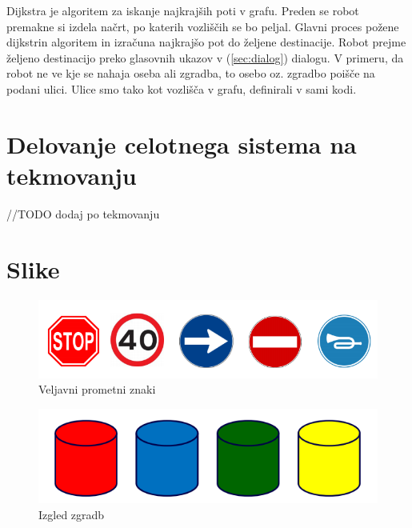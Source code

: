 \documentclass[a4paper,11pt]{article}
\begin{document}
Dijkstra je algoritem za iskanje najkrajših poti v grafu. Preden se robot premakne si izdela načrt, po katerih vozliščih se bo peljal. Glavni proces požene dijkstrin algoritem in izračuna najkrajšo pot do željene destinacije. Robot prejme željeno destinacijo preko glasovnih ukazov v (\ref{sec:dialog}{}) dialogu. V primeru, da robot ne ve kje se nahaja oseba ali zgradba, to osebo oz. zgradbo poišče na podani ulici. Ulice smo tako kot vozlišča v grafu, definirali v sami kodi.

\section{Delovanje celotnega sistema na tekmovanju}

//TODO dodaj po tekmovanju

\pagebreak
\appendix
\appendixpage
\section{\label{sec:slike}Slike}
\begin{figure}[htbp]
\begin{center}
\includegraphics[width=\textwidth]{signs.png}
\caption{Veljavni prometni znaki}
\label{slika1}
\end{center}
\end{figure}

\begin{figure}[htbp]
\begin{center}
\includegraphics[width=\textwidth]{buildings.png}
\caption{Izgled zgradb}
\label{slika1}
\end{center}
\end{figure}
\end{document}
